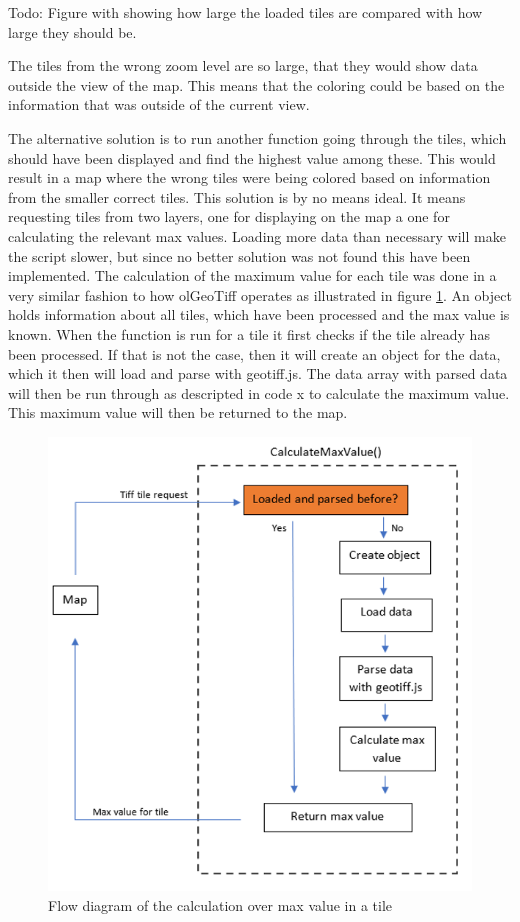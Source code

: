 Todo: Figure with showing how large the loaded tiles are compared with how large they should be.

The tiles from the wrong zoom level are so large, that they would show data outside the view of the map. This means that the coloring could be based on the information that was outside of the current view.

The alternative solution is to run another function going through the tiles, which should have been displayed and find the highest value among these. This would result in a map where the wrong tiles were being colored based on information from the smaller correct tiles. This solution is by no means ideal. It means requesting tiles from two layers, one for displaying on the map a one for calculating the relevant max values. Loading more data than necessary will make the script slower, but since no better solution was not found this have been implemented.
The calculation of the maximum value for each tile was done in a very similar fashion to how olGeoTiff operates as illustrated in figure \ref{CalculateMaxValue}. An object holds information about all tiles, which have been processed and the max value is known. When the function is run for a tile it first checks if the tile already has been processed. If that is not the case, then it will create an object for the data, which it then will load and parse with geotiff.js. The data array with parsed data will then be run through as descripted in code x to calculate the maximum value. This maximum value will then be returned to the map. 


\begin{figure} [H]
	\centering
	\includegraphics[width=.8\textwidth]{Pictures/CalculateMaxValue}
	\caption{Flow diagram of the calculation over max value in a tile}
	\label{CalculateMaxValue}
\end{figure}



